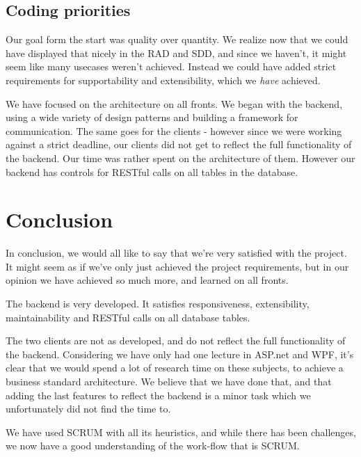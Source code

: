 \section{Coding priorities}
Our goal form the start was quality over quantity. We realize now that we could have displayed that nicely in the RAD and SDD, and since we haven't, it might seem like many usecases weren't achieved. Instead we could have added strict requirements for supportability and extensibility, which we \textit{have} achieved.


We have focused on the architecture on all fronts. We began with the backend, using a wide variety of design patterns and building a framework for communication. The same goes for the clients - however since we were working against a strict deadline, our clients did not get to reflect the full functionality of the backend. Our time was rather spent on the architecture of them. However our backend has controls for RESTful calls on all tables in the database. 


\chapter{Conclusion}
\label{chap:Conclusion}
In conclusion, we would all like to say that we're very satisfied with the project. It might seem as if we've only just achieved the project requirements, but in our opinion we have achieved so much more, and learned on all fronts.

The backend is very developed. It satisfies responsiveness, extensibility, maintainability and RESTful calls on all database tables.

The two clients are not as developed, and do not reflect the full functionality of the backend. Considering we have only had one lecture in ASP.net and WPF, it's clear that we would spend a lot of research time on these subjects, to achieve a business standard architecture. We believe that we have done that, and that adding the last features to reflect the backend is a minor task which we unfortunately did not find the time to.

We have used SCRUM with all its heuristics, and while there has been challenges, we now have a good understanding of the work-flow that is SCRUM.


